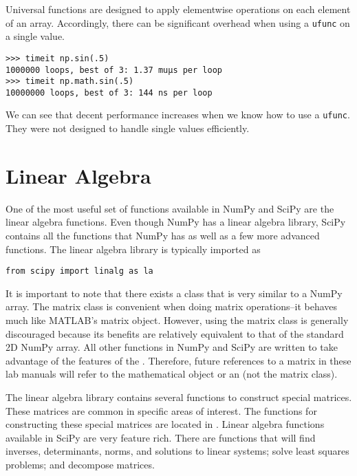 Universal functions are designed to apply elementwise operations on each 
element of an array. Accordingly, there can be significant overhead 
when using a \texttt{ufunc} on a single value.

\begin{lstlisting}
>>> timeit np.sin(.5)
1000000 loops, best of 3: 1.37 muµs per loop
>>> timeit np.math.sin(.5)
10000000 loops, best of 3: 144 ns per loop
\end{lstlisting}

We can see that decent performance increases when we know how to use a 
\texttt{ufunc}. They were not designed to handle single values efficiently.

\section*{Linear Algebra}
One of the most useful set of functions available in NumPy and SciPy are the 
linear algebra functions. Even though NumPy has a linear algebra library, 
SciPy contains all the functions that NumPy has as well as a few more advanced 
functions. The linear algebra library is typically imported as

\begin{lstlisting}
from scipy import linalg as la
\end{lstlisting}

\begin{comment}
To shorten the amount of typing, it can be aliased as 
\li{from scipy import linalg as la}.
\end{comment}

It is important to note that there exists a  class that is very 
similar to a NumPy array. The matrix class is convenient when doing matrix 
operations--it behaves much like MATLAB's matrix object.
However, using the matrix class is generally discouraged because its benefits 
are relatively equivalent to that of the standard 2D NumPy array. 
All other functions in NumPy and SciPy are written to take advantage 
of the features of the . Therefore, future references to a matrix in these lab 
manuals will refer to the mathematical object or an  (not the matrix class).

The linear algebra library contains several functions to construct special 
matrices. These matrices are common in specific areas of interest.
The functions for constructing these special matrices are located in 
. Linear algebra functions available in SciPy 
are very feature rich. There are functions that will find inverses, 
determinants, norms, and solutions to linear systems; solve least squares 
problems; and decompose matrices.

